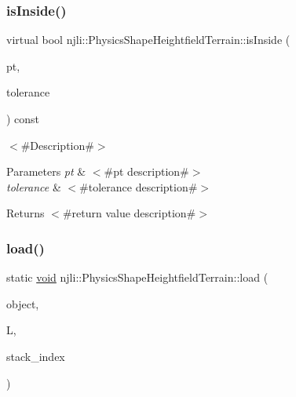 \subsubsection{\texorpdfstring{is\+Inside()}{isInside()}}
{\footnotesize\ttfamily virtual bool njli\+::\+Physics\+Shape\+Heightfield\+Terrain\+::is\+Inside (\begin{DoxyParamCaption}\item[{const bt\+Vector3 \&}]{pt,  }\item[{\mbox{\hyperlink{_util_8h_a5f6906312a689f27d70e9d086649d3fd}{f32}}}]{tolerance }\end{DoxyParamCaption}) const\hspace{0.3cm}{\ttfamily [virtual]}}

$<$\#\+Description\#$>$


\begin{DoxyParams}{Parameters}
{\em pt} & $<$\#pt description\#$>$ \\
\hline
{\em tolerance} & $<$\#tolerance description\#$>$\\
\hline
\end{DoxyParams}
\begin{DoxyReturn}{Returns}
$<$\#return value description\#$>$ 
\end{DoxyReturn}
\mbox{\label{classnjli_1_1_physics_shape_heightfield_terrain_a85ac02a73a1313365a3f4eb80640a923}} 
\subsubsection{\texorpdfstring{load()}{load()}}
{\footnotesize\ttfamily static \mbox{\hyperlink{_thread_8h_af1e856da2e658414cb2456cb6f7ebc66}{void}} njli\+::\+Physics\+Shape\+Heightfield\+Terrain\+::load (\begin{DoxyParamCaption}\item[{\mbox{\hyperlink{classnjli_1_1_physics_shape_heightfield_terrain}{Physics\+Shape\+Heightfield\+Terrain}} \&}]{object,  }\item[{lua\+\_\+\+State $\ast$}]{L,  }\item[{int}]{stack\+\_\+index }\end{DoxyParamCaption})\hspace{0.3cm}{\ttfamily [static]}}

